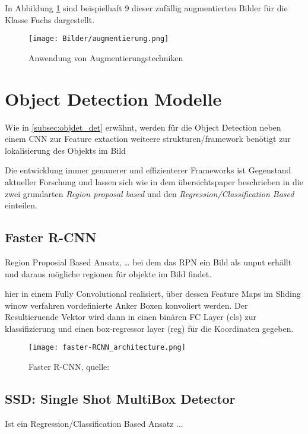 In Abbildung \ref{fig:augmentierung} sind beispielhaft 9 dieser 
zufällig augmentierten Bilder für die Klasse Fuchs dargestellt.


\begin{figure}[H]
    \centering
    \label{fig:augmentierung}
    \texttt{[image: Bilder/augmentierung.png]}
    \caption{Anwendung von Augmentierungstechniken}
\end{figure}


\section{Object Detection Modelle}


Wie in \ref{subsec:objdet_det} erwähnt, werden für die 
Object Detection neben einem CNN zur Feature extaction 
weiteere strukturen/framework benötigt zur lokalisierung 
des Objekts im Bild

Die entwicklung immer genauerer und effizienterer 
Frameworks ist Gegenstand aktueller Forschung und lassen 
sich wie in dem übersichtspaper \cite{ouaknineReviewDeepLearning}
beschrieben in die zwei grundarten \textit{Region proposal based} 
und den \textit{Regression/Classification Based} einteilen.



\subsection*{Faster R-CNN}
Region Proposial Based Ansatz, \dots \cite{renFasterRCNNRealTime2016a}
bei dem das RPN ein Bild als unput erhällt und
daraus mögliche regionen für objekte im Bild findet.

hier in einem Fully Convolutional realisiert, über dessen 
Feature Maps im Sliding winow verfahren vordefinierte Anker
 Boxen konvoliert werden. Der Resultieruende Vektor wird 
 dann in einen binären FC Layer (cls) zur klassifizierung und 
einen box-regressor layer (reg) für die Koordinaten gegeben.


\begin{figure}[H]
    \centering
    \label{fig:faster_rcnn}
    \texttt{[image: faster-RCNN\_architecture.png]}
    \caption{Faster R-CNN, quelle: \cite{ObjectDetectionDummies2017b}}
\end{figure}



\subsection*{SSD: Single Shot MultiBox Detector}
Ist ein Regression/Classification Based Ansatz ... \cite{liuSSDSingleShot2016}

